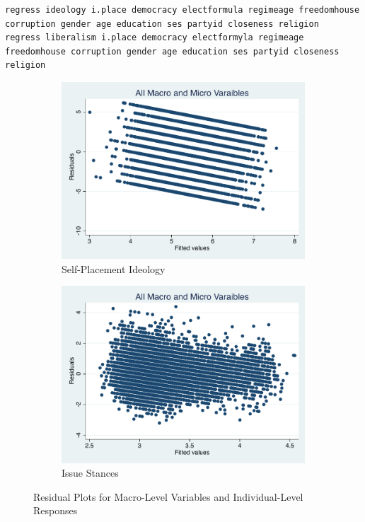 \documentclass[12pt, titlepage]{article}
\begin{document}
\begin{lstlisting}
regress ideology i.place democracy electformula regimeage freedomhouse corruption gender age education ses partyid closeness religion
regress liberalism i.place democracy electformyla regimeage freedomhouse corruption gender age education ses partyid closeness religion
\end{lstlisting}

\begin{figure}[H]
	\centering
	\begin{subfigure}[b]{0.475\textwidth}   
		\centering 
		\includegraphics[width=\textwidth]{Residuals/Macroresid}
		\caption{Self-Placement Ideology}
	\end{subfigure}
	\hfill
	\begin{subfigure}[b]{0.475\textwidth}
		\centering 
		\includegraphics[width=\textwidth]{Residuals/Macroresidlib}
		\caption{Issue Stances}
	\end{subfigure}
	\caption{Residual Plots for Macro-Level Variables and Individual-Level Responses}
	\label{AllMacroRVF}
\end{figure}
\end{document}
